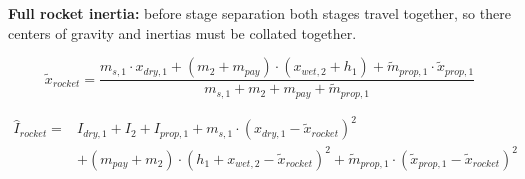 \textbf{Full rocket inertia:} before stage separation both stages travel together, so there centers of gravity and inertias must be collated together.

\begin{equation}
    \tilde{x}_{rocket} = \frac{m_{s,1} \cdot x_{dry,1} + (m_2 + m_{pay}) \cdot (x_{wet,2} + h_1) + \tilde{m}_{prop,1} \cdot \tilde{x}_{prop,1}}{m_{s,1} + m_{2} + m_{pay} + \tilde{m}_{prop,1}}
\end{equation}

\begin{equation}
\begin{aligned}
    \hat{I}_{rocket} =& I_{dry,1} + I_{2} + I_{prop,1} + m_{s,1} \cdot (x_{dry,1} - \tilde{x}_{rocket})^2 \\
    &+ (m_{pay} + m_2) \cdot (h_1 + x_{wet,2} - \tilde{x}_{rocket})^2 + \tilde{m}_{prop,1} \cdot (\tilde{x}_{prop,1} - \tilde{x}_{rocket})^2
\end{aligned}
\end{equation}